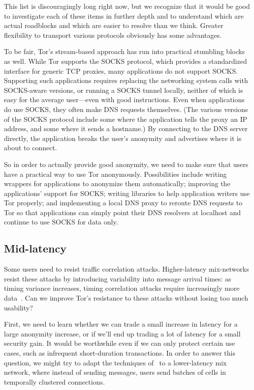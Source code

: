 \documentclass{llncs}
\begin{document}
This list is discouragingly long right now, but we recognize that it
would be good to investigate each of these items in further depth and to
understand which are actual roadblocks and which are easier to resolve
than we think. Greater flexibility to transport various protocols obviously
has some advantages.

To be fair, Tor's stream-based approach has run into practical
stumbling blocks as well. While Tor supports the SOCKS protocol,
which provides a standardized interface for generic TCP proxies, many
applications do not support SOCKS\@. Supporting such applications requires
replacing the networking system calls with SOCKS-aware
versions, or running a SOCKS tunnel locally, neither of which is
easy for the average user---even with good instructions.
Even when applications do use SOCKS, they often make DNS requests
themselves.  (The various versions of the SOCKS protocol include some where
the application tells the proxy an IP address, and some where it sends a
hostname.)  By connecting to the DNS server directly, the application breaks
the user's anonymity and advertises where it is about to connect.

So in order to actually provide good anonymity, we need to make sure that
users have a practical way to use Tor anonymously.  Possibilities include
writing wrappers for applications to anonymize them automatically; improving
the applications' support for SOCKS; writing libraries to help application
writers use Tor properly; and implementing a local DNS proxy to reroute DNS
requests to Tor so that applications can simply point their DNS resolvers at
localhost and continue to use SOCKS for data only.

\subsection{Mid-latency}
\label{subsec:mid-latency}

Some users need to resist traffic correlation attacks.  Higher-latency
mix-networks resist these attacks by introducing variability into message
arrival times: as timing variance increases, timing correlation attacks
require increasingly more data~\cite{e2e-traffic}. Can we improve Tor's
resistance to these attacks without losing too much usability?

First, we need to learn whether we can trade a small increase in latency
for a large anonymity increase, or if we'll end up trading a lot of
latency for a small security gain. It would be worthwhile even if we
can only protect certain use cases, such as infrequent short-duration
transactions.  In order to answer this question, we might
try to adapt the techniques of~\cite{e2e-traffic} to a lower-latency mix
network, where instead of sending messages, users send batches
of cells in temporally clustered connections.
\end{document}
